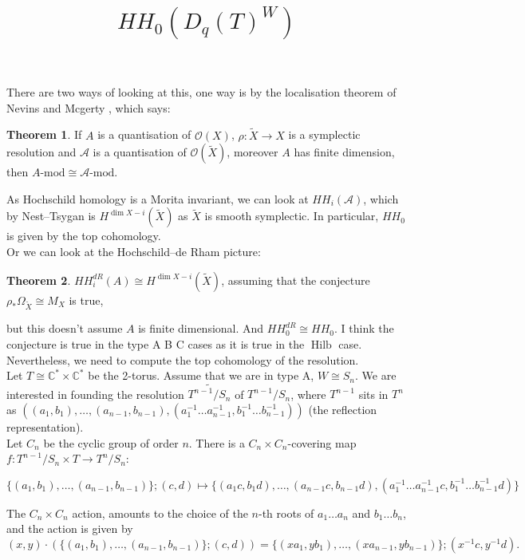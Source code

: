 \documentclass{article}
\title{$HH_0(D_q(T)^W)$}
\theoremstyle{definition}
\newtheorem{theorem}{Theorem}[section]
\DeclareMathOperator{\Hilb}{{\text{Hilb}}}
\newcommand{\Modu}{{\text{-mod}}}
\begin{document}
\maketitle

There are two ways of looking at this, one way is by the localisation theorem of Nevins and Mcgerty \cite{article1}, which says:
\begin{theorem}
If $A$ is a quantisation of $\mathcal{O}(X)$, $\rho:\tilde{X}\to X$ is a symplectic resolution and $\mathcal{A}$ is a quantisation of $\mathcal{O}(\tilde{X})$, moreover $A$ has finite dimension, then $A\Modu\cong \mathcal{A}\Modu$. 
\end{theorem}

As Hochschild homology is a Morita invariant, we can look at $HH_i(\mathcal{A})$, which by Nest--Tsygan is $H^{\dim X -i}(\tilde{X})$ as $\tilde{X}$ is smooth symplectic. In particular, $HH_0$ is given by the top cohomology.\\

Or we can look at the Hochschild--de Rham picture: 
\begin{theorem}
$HH^{dR}_i(A)\cong H^{\dim X -i}(\tilde{X})$, assuming that the conjecture $\rho_*\Omega_{\tilde{X}}\cong M_X$ is true,
\end{theorem}
but this doesn't assume $A$ is finite dimensional. And $HH^{dR}_0\cong HH_0$. I think the conjecture is true in the type A B C cases as it is true in the $\Hilb$ case.\\

Nevertheless, we need to compute the top cohomology of the resolution.\\

Let $T\cong \mathbb{C}^*\times\mathbb{C}^*$ be the 2-torus. Assume that we are in type A, $W\cong S_n$. We are interested in founding the resolution $\widetilde{T^{n-1}/S_n}$ of $T^{n-1}/S_n$, where $T^{n-1}$ sits in $T^n$ as $((a_1,b_1),\dots,(a_{n-1}, b_{n-1}),(a_1^{-1}\dots a_{n-1}^{-1}, b_1^{-1}\dots b_{n-1}^{-1}))$ (the reflection representation). \\

Let $C_n$ be the cyclic group of order $n$. There is a $C_n\times C_n$-covering map $f:T^{n-1}/S_n\times T\to T^n/S_n$:

$$\{(a_1,b_1),\dots,(a_{n-1}, b_{n-1})\};(c,d)\mapsto \{(a_1c,b_1d),\dots,(a_{n-1}c, b_{n-1}d),(a_1^{-1}\dots a_{n-1}^{-1}c, b_1^{-1}\dots b_{n-1}^{-1}d)\}$$

The $C_n\times C_n$ action, amounts to the choice of the $n$-th roots of $a_1\dots a_n$ and $b_1 \dots b_n$, and the action is given by 
$$(x,y)\cdot (\{(a_1,b_1),\dots,(a_{n-1}, b_{n-1})\};(c,d))=\{(xa_1,yb_1),\dots,(xa_{n-1}, yb_{n-1})\};(x^{-1}c,y^{-1}d).$$
\end{document}
